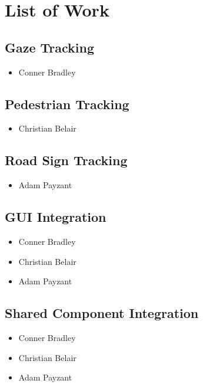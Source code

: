 \section{List of Work}

\subsection{Gaze Tracking}
\begin{itemize}
    \item Conner Bradley
\end{itemize}

\subsection{Pedestrian Tracking}
\begin{itemize}
    \item Christian Belair
\end{itemize}

\subsection{Road Sign Tracking}
\begin{itemize}
    \item Adam Payzant
\end{itemize}

\subsection{GUI Integration}
\begin{itemize}
    \item Conner Bradley
    \item Christian Belair
    \item Adam Payzant
\end{itemize}

\subsection{Shared Component Integration}
\begin{itemize}
    \item Conner Bradley
    \item Christian Belair
    \item Adam Payzant
\end{itemize}